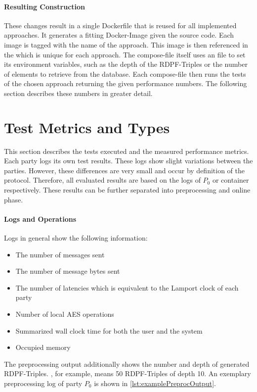 \paragraph{Resulting Construction}\label{par:dockerConstruction}
These changes result in a single Dockerfile that is reused for all implemented approaches.
It generates a fitting Docker-Image given the source code.
Each image is tagged with the name of the approach.
This image is then referenced in the  which is unique for each approach.
The compose-file itself uses an  file to set its environment variables, such as the depth of the RDPF-Triples or the number of elements to retrieve from the database.
Each compose-file then runs the tests of the chosen approach returning the given performance numbers.
The following section describes these numbers in greater detail.

\section{Test Metrics and Types}\label{sub:testMetricsAndTypes}
This section describes the tests executed and the measured performance metrics.
Each party logs its own test results.
These logs show slight variations between the parties.
However, these differences are very small and occur by definition of the protocol.
Therefore, all evaluated results are based on the logs of $P_0$ or container  respectively.
These results can be further separated into preprocessing and online phase.

\paragraph{Logs and Operations}\label{par:expOutputs}
Logs in general show the following information:
\begin{itemize}
    \item The number of messages sent 
    \item The number of message bytes sent 
    \item The number of latencies which is equivalent to the Lamport clock of each party
    \item Number of local AES operations
    \item Summarized wall clock time for both the user and the system
    \item Occupied memory
\end{itemize}
The preprocessing output additionally shows the number and depth of generated RDPF-Triples.
, for example, means 50 RDPF-Triples of depth 10.
An exemplary preprocessing log of party $P_0$ is shown in \ref{lst:examplePreprocOutput}.

